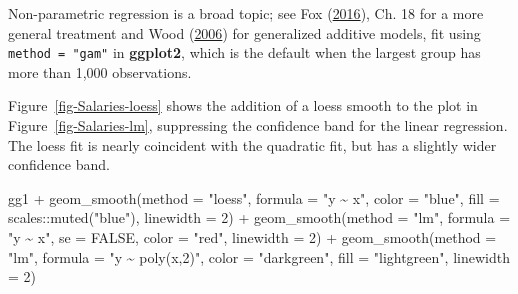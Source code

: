 \documentclass[
  letterpaper,
  10pt,
  krantz2]{krantz}
\makeatletter
\newenvironment{Shaded}{\begin{snugshade}}{\end{snugshade}}
\newcommand{\AttributeTok}[1]{\textcolor[rgb]{0.40,0.45,0.13}{#1}}
\newcommand{\ConstantTok}[1]{\textcolor[rgb]{0.56,0.35,0.01}{#1}}
\newcommand{\DecValTok}[1]{\textcolor[rgb]{0.68,0.00,0.00}{#1}}
\newcommand{\FunctionTok}[1]{\textcolor[rgb]{0.28,0.35,0.67}{#1}}
\newcommand{\NormalTok}[1]{\textcolor[rgb]{0.00,0.23,0.31}{#1}}
\newcommand{\SpecialCharTok}[1]{\textcolor[rgb]{0.37,0.37,0.37}{#1}}
\newcommand{\StringTok}[1]{\textcolor[rgb]{0.13,0.47,0.30}{#1}}
\newenvironment{kframe}{%
  \medskip{}
  \setlength{\fboxsep}{.8em}
  \def\at@end@of@kframe{}%
  \ifinner\ifhmode%
  \def\at@end@of@kframe{\end{minipage}}%
  \begin{minipage}{\columnwidth}%
  \fi\fi%
  \def\FrameCommand##1{\hskip\@totalleftmargin \hskip-\fboxsep
  \colorbox{shadecolor}{##1}\hskip-\fboxsep
      \hskip-\linewidth \hskip-\@totalleftmargin \hskip\columnwidth}%
  \MakeFramed {\advance\hsize-\width
    \@totalleftmargin\z@ \linewidth\hsize
    \@setminipage}}%
{\par\unskip\endMakeFramed%
  \at@end@of@kframe}
\renewenvironment{Shaded}{\begin{kframe}}{\end{kframe}}
\makeatother
\begin{document}
Non-parametric regression is a broad topic; see Fox
(\protect\hyperlink{ref-Fox:2016:ARA}{2016}), Ch. 18 for a more general
treatment and Wood (\protect\hyperlink{ref-Wood:2006}{2006}) for
generalized additive models, fit using \texttt{method\ =\ "gam"} in
\textbf{ggplot2}, which is the default when the largest group has more
than 1,000 observations.

Figure~\ref{fig-Salaries-loess} shows the addition of a loess smooth to
the plot in Figure~\ref{fig-Salaries-lm}, suppressing the confidence
band for the linear regression. The loess fit is nearly coincident with
the quadratic fit, but has a slightly wider confidence band.

\begin{Shaded}
\begin{Highlighting}[]
\NormalTok{gg1 }\SpecialCharTok{+} 
  \FunctionTok{geom\_smooth}\NormalTok{(}\AttributeTok{method =} \StringTok{"loess"}\NormalTok{, }\AttributeTok{formula =} \StringTok{"y \textasciitilde{} x"}\NormalTok{, }
              \AttributeTok{color =} \StringTok{"blue"}\NormalTok{, }\AttributeTok{fill =}\NormalTok{ scales}\SpecialCharTok{::}\FunctionTok{muted}\NormalTok{(}\StringTok{"blue"}\NormalTok{),}
              \AttributeTok{linewidth =} \DecValTok{2}\NormalTok{) }\SpecialCharTok{+}
  \FunctionTok{geom\_smooth}\NormalTok{(}\AttributeTok{method =} \StringTok{"lm"}\NormalTok{, }\AttributeTok{formula =} \StringTok{"y \textasciitilde{} x"}\NormalTok{, }\AttributeTok{se =} \ConstantTok{FALSE}\NormalTok{,}
              \AttributeTok{color =} \StringTok{"red"}\NormalTok{,}
              \AttributeTok{linewidth =} \DecValTok{2}\NormalTok{) }\SpecialCharTok{+}
  \FunctionTok{geom\_smooth}\NormalTok{(}\AttributeTok{method =} \StringTok{"lm"}\NormalTok{, }\AttributeTok{formula =} \StringTok{"y \textasciitilde{} poly(x,2)"}\NormalTok{, }
              \AttributeTok{color =} \StringTok{"darkgreen"}\NormalTok{, }\AttributeTok{fill =} \StringTok{"lightgreen"}\NormalTok{,}
              \AttributeTok{linewidth =} \DecValTok{2}\NormalTok{) }
\end{Highlighting}
\end{Shaded}
\end{document}
